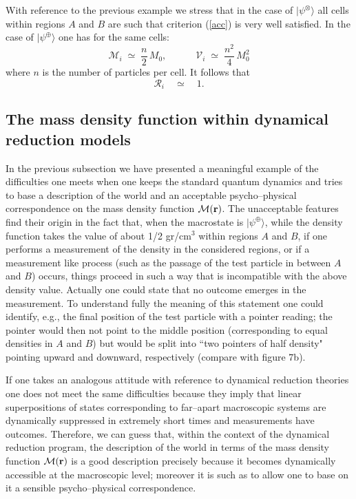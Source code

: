 \documentclass[10pt,a4paper]{article}
\begin{document}
With reference to the previous example we stress that in the case
of $|\psi^{\otimes}\rangle$ all cells within regions $A$ and $B$
are such that criterion (\ref{acc}) is very well satisfied. In the
case of $|\psi^{\oplus}\rangle$ one has for the same cells:
\begin{equation}
{\mathcal M}_{i} \; \simeq \; \frac{n}{2}\,M_{0}, \quad\qquad
{\mathcal V}_{i} \; \simeq \; \frac{n^{2}}{4}\, M_{0}^{2}
\end{equation}
where $n$ is the number of particles per cell. It follows that
\begin{equation} {\mathcal R}_{i} \quad \simeq \quad 1.
\end{equation}

\subsection{The mass density function within dynamical reduction
models} \label{sec123}

In the previous subsection we have presented a meaningful example
of the difficulties one meets when one keeps the standard quantum
dynamics and tries to base a description of the world and an
acceptable psycho--physical correspondence on the mass density
function ${\mathcal M}({\bf r})$. The unacceptable features find
their origin in the fact that, when the macrostate is
$|\psi^{\oplus}\rangle$, while the density function takes the
value of about 1/2 gr/cm$^{3}$ within regions $A$ and $B$, if one
performs a measurement of the density in the considered regions,
or if a measurement like process (such as the passage of the test
particle in between $A$ and $B$) occurs, things proceed in such a
way that is incompatible with the above density value. Actually
one could state that no outcome emerges in the measurement. To
understand fully the meaning of this statement one could identify,
e.g., the final position of the test particle with a pointer
reading; the pointer would then not point to the middle position
(corresponding to equal densities in $A$ and $B$) but would be
split into ``two pointers of half density" pointing upward and
downward, respectively (compare with figure 7b).

If one takes an analogous attitude with reference to dynamical
reduction theories one does not meet the same difficulties because
they imply that linear superpositions of states corresponding to
far--apart macroscopic systems are dynamically suppressed in
extremely short times and measurements have outcomes. Therefore,
we can guess that, within the context of the dynamical reduction
program, the description of the world in terms of the mass density
function ${\mathcal M}({\bf r})$ is a good description precisely
because it becomes dynamically accessible at the macroscopic
level; moreover it is such as to allow one to base on it a
sensible psycho--physical correspondence.
\end{document}
